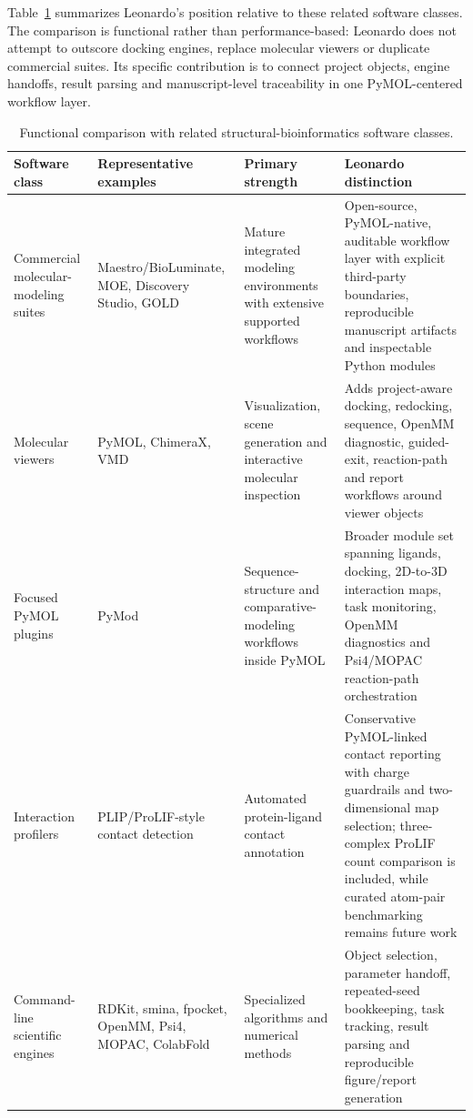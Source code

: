 \documentclass[pdflatex,sn-vancouver-num]{sn-jnl}
\begin{document}
Table~\ref{tab:related_software} summarizes Leonardo's position relative to these related software classes.  The comparison is functional rather than performance-based: Leonardo does not attempt to outscore docking engines, replace molecular viewers or duplicate commercial suites.  Its specific contribution is to connect project objects, engine handoffs, result parsing and manuscript-level traceability in one PyMOL-centered workflow layer.

\begin{table}[htbp]
\caption{Functional comparison with related structural-bioinformatics software classes.}\label{tab:related_software}
\footnotesize
\begin{tabularx}{\textwidth}{>{\raggedright\arraybackslash}p{}>{\raggedright\arraybackslash}X>{\raggedright\arraybackslash}X>{\raggedright\arraybackslash}X}
\toprule
Software class & Representative examples & Primary strength & Leonardo distinction \\
\midrule
Commercial molecular-modeling suites & Maestro/BioLuminate, MOE, Discovery Studio, GOLD \cite{schrodinger_maestro,schrodinger_bioluminate,moe,discovery_studio,ccdc_gold} & Mature integrated modeling environments with extensive supported workflows & Open-source, PyMOL-native, auditable workflow layer with explicit third-party boundaries, reproducible manuscript artifacts and inspectable Python modules \\
Molecular viewers & PyMOL, ChimeraX, VMD \cite{pymol,chimerax2021,vmd1996} & Visualization, scene generation and interactive molecular inspection & Adds project-aware docking, redocking, sequence, OpenMM diagnostic, guided-exit, reaction-path and report workflows around viewer objects \\
Focused PyMOL plugins & PyMod \cite{pymod2017} & Sequence-structure and comparative-modeling workflows inside PyMOL & Broader module set spanning ligands, docking, 2D-to-3D interaction maps, task monitoring, OpenMM diagnostics and Psi4/MOPAC reaction-path orchestration \\
Interaction profilers & PLIP/ProLIF-style contact detection \cite{plip2015,prolif2021} & Automated protein-ligand contact annotation & Conservative PyMOL-linked contact reporting with charge guardrails and two-dimensional map selection; three-complex ProLIF count comparison is included, while curated atom-pair benchmarking remains future work \\
Command-line scientific engines & RDKit, smina, fpocket, OpenMM, Psi4, MOPAC, ColabFold \cite{rdkit,smina2013,fpocket2009,openmm2017,psi42020,mopac1990,colabfold2022} & Specialized algorithms and numerical methods & Object selection, parameter handoff, repeated-seed bookkeeping, task tracking, result parsing and reproducible figure/report generation \\
\bottomrule
\end{tabularx}
\end{table}
\end{document}
